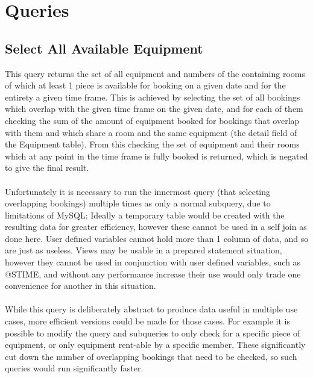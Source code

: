 \documentclass[a4paper, titlepage]{article}
\begin{document}
\section{Queries} \label{sec:queries}

\subsection{Select All Available Equipment} \label{subsec:equipmentquery}
This query returns the set of all equipment and numbers of the containing rooms of which at least 1 piece is available for booking on a given date and for the entirety a given time frame. This is achieved by selecting the set of all bookings which overlap with the given time frame on the given date, and for each of them checking the sum of the amount of equipment booked for bookings that overlap with them and which share a room and the same equipment (the detail field of the Equipment table). From this checking the set of equipment and their rooms which at any point in the time frame is fully booked is returned, which is negated to give the final result.
\\ \\
Unfortunately it is necessary to run the innermost query (that selecting overlapping bookings) multiple times as only a normal subquery, due to limitations of MySQL: Ideally a temporary table would be created with the resulting data for greater efficiency, however these cannot be used in a self join as done here. User defined variables cannot hold more than 1 column of data, and so are just as useless. Views may be usable in a prepared statement situation, however they cannot be used in conjunction with user defined variables, such as @STIME, and without any performance increase their use would only trade one convenience for another in this situation.
\\ \\
While this query is deliberately abstract to produce data useful in multiple use cases, more efficient versions could be made for those cases. For example it is possible to modify the query and subqueries to only check for a specific piece of equipment, or only equipment rent-able by a specific member. These significantly cut down the number of overlapping bookings that need to be checked, so such queries would run significantly faster.
\end{document}
